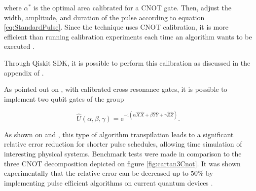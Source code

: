     \noindent where $\alpha^{*}$ is the optimal area calibrated for a CNOT gate. Then, adjust the width, amplitude, and duration of the pulse according to equation \ref{eq:StandardPulse}. Since the technique uses CNOT calibration, it is more efficient than running calibration experiments each time an algorithm wants to be executed \cite{MajoranaSimulation}.
    
    Through Qiskit SDK, it is possible to perform this calibration as discussed in the appendix of \cite{RXZPulseEfficient}.

    As pointed out on \cite{RXZPulseEfficient}, with calibrated cross resonance gates, it is possible to implement two qubit gates of the group

    \begin{equation}
      \hat{U}(\alpha, \beta, \gamma) = \mathrm{e}^{-\mathrm{i}(\alpha\hat{X}\hat{X} + \beta\hat{Y}\hat{Y} + \gamma\hat{Z}\hat{Z})}.
      \label{eq:CartanDecomp}
    \end{equation}

    

    As shown on \cite{RXZPulseEfficient} and \cite{MajoranaSimulation}, this type of algorithm transpilation leads to a significant relative error reduction for shorter pulse schedules, allowing time simulation of interesting physical systems. Benchmark tests were made in comparison to the three CNOT decomposition depicted on figure \ref{fig:cartan3Cnot}. It was shown experimentally that the relative error can be decreased up to $50\%$ by implementing pulse efficient algorithms on current quantum devices \cite{RXZPulseEfficient}.


